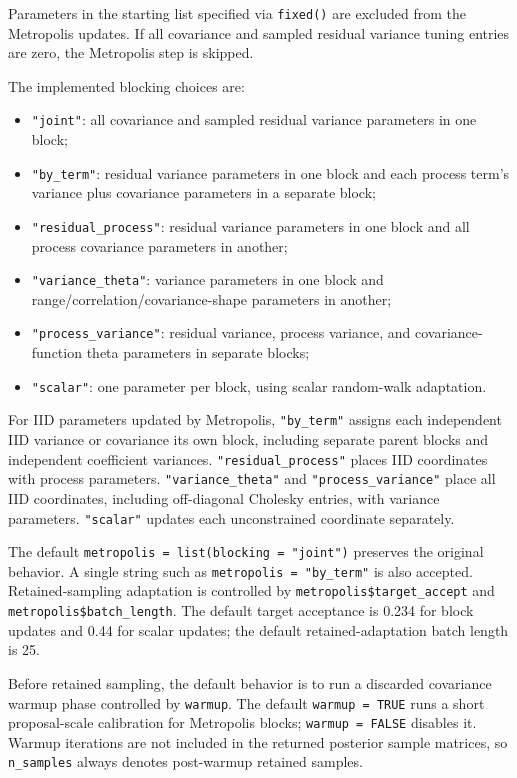 \documentclass[11pt]{article}
\begin{document}
Parameters in the starting list specified via \texttt{fixed()} are excluded from the Metropolis updates. If all covariance and sampled residual variance tuning entries are zero, the Metropolis step is skipped.

The implemented blocking choices are:
\begin{itemize}
\item \texttt{"joint"}: all covariance and sampled residual variance parameters in one block;
\item \texttt{"by\_term"}: residual variance parameters in one block and each process term's variance plus covariance parameters in a separate block;
\item \texttt{"residual\_process"}: residual variance parameters in one block and all process covariance parameters in another;
\item \texttt{"variance\_theta"}: variance parameters in one block and range/correlation/covariance-shape parameters in another;
\item \texttt{"process\_variance"}: residual variance, process variance, and covariance-function theta parameters in separate blocks;
\item \texttt{"scalar"}: one parameter per block, using scalar random-walk adaptation.
\end{itemize}

For IID parameters updated by Metropolis, \texttt{"by\_term"} assigns each independent IID
variance or covariance its own block, including separate parent blocks and
independent coefficient variances. \texttt{"residual\_process"} places IID
coordinates with process parameters. \texttt{"variance\_theta"} and
\texttt{"process\_variance"} place all IID coordinates, including off-diagonal
Cholesky entries, with variance parameters. \texttt{"scalar"} updates each
unconstrained coordinate separately.

The default \texttt{metropolis = list(blocking = "joint")} preserves the original behavior. A single string such as \texttt{metropolis = "by\_term"} is also accepted. Retained-sampling adaptation is controlled by \texttt{metropolis\$target\_accept} and \texttt{metropolis\$batch\_length}. The default target acceptance is 0.234 for block updates and 0.44 for scalar updates; the default retained-adaptation batch length is 25.

Before retained sampling, the default behavior is to run a discarded covariance warmup phase controlled by \texttt{warmup}. The default \texttt{warmup = TRUE} runs a short proposal-scale calibration for Metropolis blocks; \texttt{warmup = FALSE} disables it. Warmup iterations are not included in the returned posterior sample matrices, so \texttt{n\_samples} always denotes post-warmup retained samples.
\end{document}
